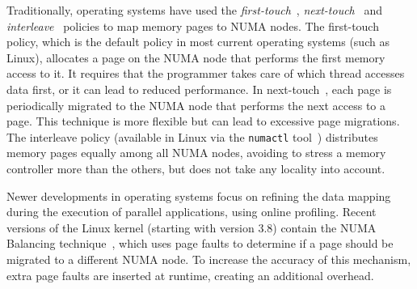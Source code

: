 
Traditionally, operating systems have used the \emph{first-touch}~\cite{Marchetti1995}, \emph{next-touch}~\cite{Lof2005} and \emph{interleave}~\cite{Kleen2004} policies to map memory pages to NUMA nodes.
The first-touch policy, which is the default policy in most current operating systems (such as Linux), allocates a page on the NUMA node that performs the first memory access to it.
It requires that the programmer takes care of which thread accesses data
first, or it can lead to reduced performance.
In next-touch~\cite{Lof2005}, each page is periodically migrated to the NUMA
node that performs the next access to a page. This technique is more flexible
but can lead to excessive page migrations.
The interleave policy (available in Linux via the \texttt{numactl}
tool~\cite{Kleen2004}) distributes memory pages equally among all NUMA nodes,
avoiding to stress a memory controller more than the others, but does not take any locality into account.

Newer developments in operating systems focus on refining the data mapping during the execution of parallel applications, using online profiling.
Recent versions of the Linux kernel (starting with version 3.8) contain the
NUMA Balancing technique~\cite{Corbet}, which uses page faults to determine if
a page should be migrated to a different NUMA node. To increase the accuracy
of this mechanism, extra page faults are inserted at runtime, creating an additional overhead.

